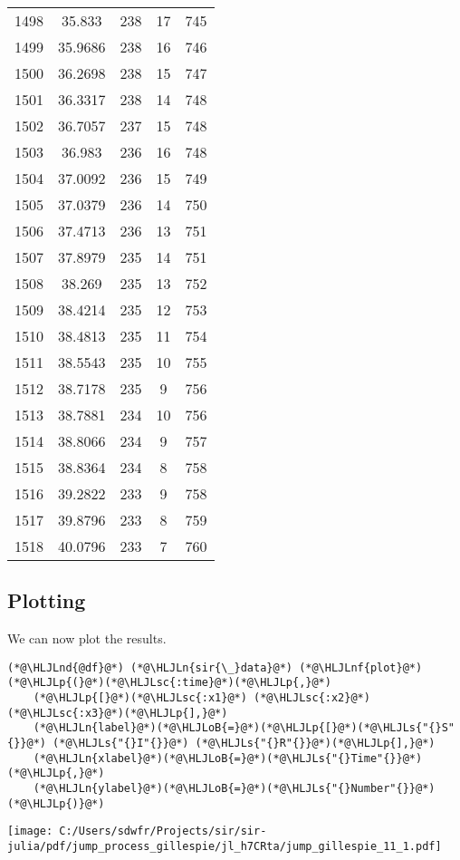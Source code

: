 \documentclass[12pt,a4paper]{article}
\newcommand{\HLJLn}[1]{#1}
\newcommand{\HLJLnd}[1]{\textcolor[RGB]{214,102,97}{#1}}
\newcommand{\HLJLnf}[1]{\textcolor[RGB]{66,102,213}{#1}}
\newcommand{\HLJLs}[1]{\textcolor[RGB]{201,61,57}{#1}}
\newcommand{\HLJLsc}[1]{\textcolor[RGB]{201,61,57}{#1}}
\newcommand{\HLJLoB}[1]{\textcolor[RGB]{102,102,102}{\textbf{#1}}}
\newcommand{\HLJLp}[1]{#1}
\begin{document}
\begin{tabular}{r|cccc}
	1498 & 35.833 & 238 & 17 & 745 \\
	1499 & 35.9686 & 238 & 16 & 746 \\
	1500 & 36.2698 & 238 & 15 & 747 \\
	1501 & 36.3317 & 238 & 14 & 748 \\
	1502 & 36.7057 & 237 & 15 & 748 \\
	1503 & 36.983 & 236 & 16 & 748 \\
	1504 & 37.0092 & 236 & 15 & 749 \\
	1505 & 37.0379 & 236 & 14 & 750 \\
	1506 & 37.4713 & 236 & 13 & 751 \\
	1507 & 37.8979 & 235 & 14 & 751 \\
	1508 & 38.269 & 235 & 13 & 752 \\
	1509 & 38.4214 & 235 & 12 & 753 \\
	1510 & 38.4813 & 235 & 11 & 754 \\
	1511 & 38.5543 & 235 & 10 & 755 \\
	1512 & 38.7178 & 235 & 9 & 756 \\
	1513 & 38.7881 & 234 & 10 & 756 \\
	1514 & 38.8066 & 234 & 9 & 757 \\
	1515 & 38.8364 & 234 & 8 & 758 \\
	1516 & 39.2822 & 233 & 9 & 758 \\
	1517 & 39.8796 & 233 & 8 & 759 \\
	1518 & 40.0796 & 233 & 7 & 760 \\
\end{tabular}


\subsection{Plotting}
We can now plot the results.


\begin{lstlisting}
(*@\HLJLnd{@df}@*) (*@\HLJLn{sir{\_}data}@*) (*@\HLJLnf{plot}@*)(*@\HLJLp{(}@*)(*@\HLJLsc{:time}@*)(*@\HLJLp{,}@*)
    (*@\HLJLp{[}@*)(*@\HLJLsc{:x1}@*) (*@\HLJLsc{:x2}@*) (*@\HLJLsc{:x3}@*)(*@\HLJLp{],}@*)
    (*@\HLJLn{label}@*)(*@\HLJLoB{=}@*)(*@\HLJLp{[}@*)(*@\HLJLs{"{}S"{}}@*) (*@\HLJLs{"{}I"{}}@*) (*@\HLJLs{"{}R"{}}@*)(*@\HLJLp{],}@*)
    (*@\HLJLn{xlabel}@*)(*@\HLJLoB{=}@*)(*@\HLJLs{"{}Time"{}}@*)(*@\HLJLp{,}@*)
    (*@\HLJLn{ylabel}@*)(*@\HLJLoB{=}@*)(*@\HLJLs{"{}Number"{}}@*)(*@\HLJLp{)}@*)
\end{lstlisting}

\texttt{[image: C:/Users/sdwfr/Projects/sir/sir-julia/pdf/jump\_process\_gillespie/jl\_h7CRta/jump\_gillespie\_11\_1.pdf]}
\end{document}
